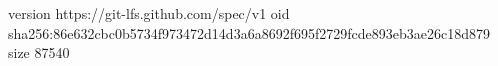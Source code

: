 version https://git-lfs.github.com/spec/v1
oid sha256:86e632cbc0b5734f973472d14d3a6a8692f695f2729fcde893eb3ae26c18d879
size 87540

